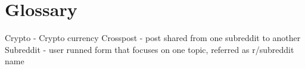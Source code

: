\section*{Glossary}
Crypto - Crypto currency
\newline
Crosspost - post shared from one subreddit to another
\newline
Subreddit - user runned form that focuses on one topic, referred as r/subreddit name
